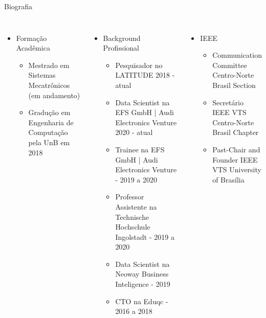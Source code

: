 

  
 
 


\justify
 \maketitle


\begin {frame}[shrink=30]{Biografia}
\small
\begin{columns}[c]
\centering
\begin{itemize}
  \item Formação Acadêmica
  \begin{itemize}
    \item Mestrado em Sistemas Mecatrônicos (em andamento)
    \item Gradução em Engenharia de Computação pela UnB em 2018
  \end{itemize}
\end{itemize}

\begin{itemize}
  \item Background Profissional
  \begin{itemize}
    \item Pesquisador no LATITUDE 2018 - atual
    \item Data Scientist na EFS GmbH | Audi Electronics Venture 2020 - atual
    \item Trainee na EFS GmbH | Audi Electronics Venture - 2019 a 2020
    \item Professor Assistente na Technische Hochschule Ingolstadt - 2019 a 2020
    \item Data Scientist na Neoway Business Inteligence - 2019
    \item CTO na Eduqc - 2016 a 2018
  \end{itemize}
\end{itemize}


\centering

\begin{itemize}
  \item IEEE
  \begin{itemize}
    \item Communication Committee Centro-Norte Brasil Section
    \item Secretário IEEE VTS Centro-Norte Brasil Chapter
    \item Past-Chair and Founder IEEE VTS University of Brasília
  \end{itemize}
\end{itemize}


\end{columns}
\end{frame}
